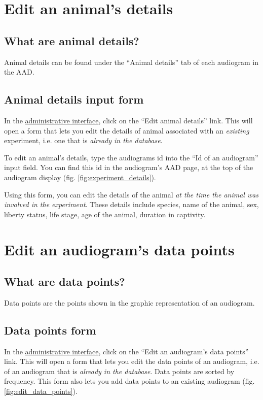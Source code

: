 \documentclass{article}
\begin{document}
\section{Edit an animal's details}
\subsection{What are animal details?}
Animal details can be found under the ``Animal details'' tab of each audiogram in the AAD.

\subsection{Animal details input form}
In the \href{https://animalaudiograms.museumfuernaturkunde.berlin/admin/v1/start}{administrative interface}, click on the ``Edit animal details'' link. This will open a form that lets you edit the details of animal associated with an \emph{existing} experiment, i.e. one that is \emph{already in the database}.

To edit an animal's details, type the audiograms id into the ``Id of an audiogram'' input field. You can find this id in the audiogram's AAD page, at the top of the audiogram display (fig. \ref{fig:experiment_details}).

Using this form, you can edit the details of the animal \emph{at the time the animal was involved in the experiment}. These details include species, name of the animal, sex, liberty status, life stage, age of the animal, duration in captivity. 

\section{Edit an audiogram's data points}
\subsection{What are data points?}
Data points are the points shown in the graphic representation of an audiogram.

\subsection{Data points form}
In the \href{https://animalaudiograms.museumfuernaturkunde.berlin/admin/v1/start}{administrative interface}, click on the ``Edit an audiogram's data points'' link. This will open a form that lets you edit the data points of an audiogram, i.e. of an audiogram that is \emph{already in the database}. Data points are sorted by frequency. This form also lets you add data points to an existing audiogram (fig. \ref{fig:edit_data_points}).
\end{document}
